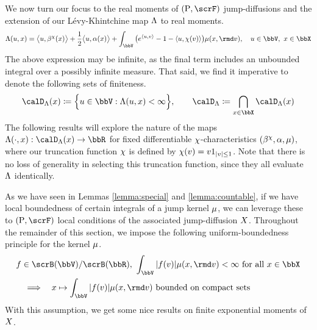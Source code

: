 We now turn our focus to the real moments of $(\Prb, \scrF)$ jump-diffusions and the extension of our L\'evy-Khintchine map $\Lambda$ to real moments.
\begin{equation*}
  \ode(\momentVar, \stateVar) = \bprj{\momentVar}{\affDrift^\trunc(\stateVar)} + \frac12\bprj{\momentVar}{\affDiff(\stateVar)} + \int_\vecSpace \big( e^\prj{\momentVar}{\markVar} - 1 - \prj{\momentVar}{\trunc(\markVar)} \big) \affJump(\stateVar, \rmd\markVar), \quad \momentVar \in \vecSpace, ~ \stateVar \in \stateSpace
\end{equation*}
The above expression may be infinite, as the final term includes an unbounded integral over a possibly infinite measure.
That said, we find it imperative to denote the following sets of finiteness.
\begin{equation}
  \label{eq:odeSpace-general}
  \odeSpace(\stateVar) \defeq \Big\{ \momentVar \in \vecSpace : \ode(\momentVar, \stateVar) < \infty \Big\}, \qquad
  \odeSpace \defeq \bigcap_{\stateVar \in \stateSpace} \odeSpace(\stateVar)
\end{equation}
The following results will explore the nature of the maps $\ode(\cdot,\stateVar): \odeSpace(\stateVar) \rightarrow \bbR$ for fixed differentiable $\chi$-characteristics $(\beta^\chi, \alpha, \mu)$, where our truncation function $\chi$ is defined by $\chi(v) = v 1_{|v|\leq 1}$.
Note that there is no loss of generality in selecting this truncation function, since they all evaluate $\Lambda$ identically.





As we have seen in Lemmas \ref{lemma:special} and \ref{lemma:countable}, if we have local boundedness of certain integrals of a jump kernel $\mu$, we can leverage these to $(\Prb, \scrF)$ local conditions of the associated jump-diffusion $X$.
Throughout the remainder of this section, we impose the following uniform-boundedness principle for the kernel $\mu$.
\begin{equation}
  \label{eq:affJump-regularity}
  \begin{aligned}
    &f \in \scrB(\vecSpace)/\scrB(\bbR), ~ \int_\vecSpace |f(\markVar)| \affJump(\stateVar, \rmd\markVar) < \infty \text{ for all } \stateVar \in \stateSpace \\
    &\quad\Longrightarrow\quad \stateVar \mapsto \int_\vecSpace |f(\markVar)| \affJump(\stateVar, \rmd\markVar) \text{ bounded on compact sets}
  \end{aligned}
\end{equation}
With this assumption, we get some nice results on finite exponential moments of $X$.

